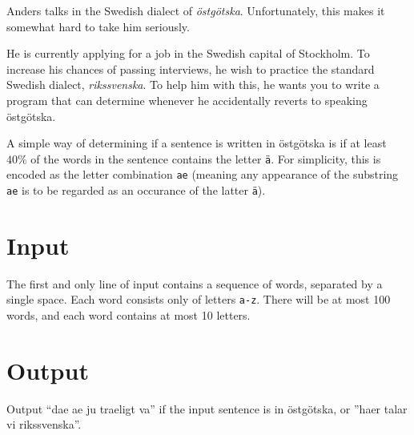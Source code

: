 Anders talks in the Swedish dialect of \emph{östgötska}.
Unfortunately, this makes it somewhat hard to take him seriously.

He is currently applying for a job in the Swedish capital of Stockholm.
To increase his chances of passing interviews, he wish to practice the standard Swedish dialect,
\emph{rikssvenska}.
To help him with this, he wants you to write a program that can determine whenever he accidentally reverts to speaking östgötska.

A simple way of determining if a sentence is written in östgötska is if at least $40\%$ of the words in the sentence contains the letter \texttt{ä}.
For simplicity, this is encoded as the letter combination \texttt{ae} (meaning any appearance of the substring \texttt{ae} is to be regarded as an occurance of the latter \texttt{ä}).

\section*{Input}
The first and only line of input contains a sequence of words, separated by a single space.
Each word consists only of letters \texttt{a-z}.
There will be at most 100 words, and each word contains at most 10 letters.

\section*{Output}
Output ``dae ae ju traeligt va'' if the input sentence is in östgötska, or ''haer talar vi rikssvenska''.
